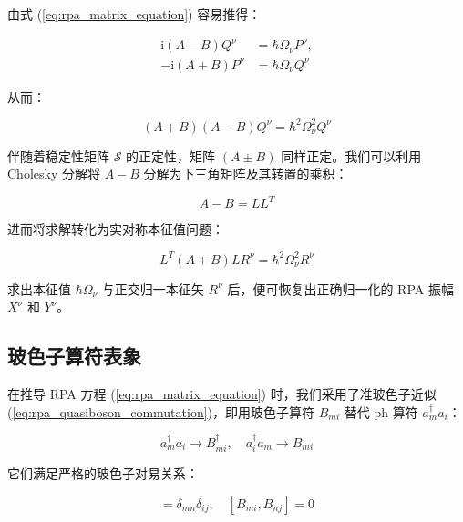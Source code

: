 由式 (\ref{eq:rpa_matrix_equation}) 容易推得：

\begin{align}
\mathrm{i}(A-B)Q^{\nu} & =\hbar\Omega_{\nu}P^{\nu},\nonumber \\
-\mathrm{i}(A+B)P^{\nu} & =\hbar\Omega_{\nu}Q^{\nu}\label{eq:rpa_pq_decoupled_system}
\end{align}

从而：

\begin{equation}
(A+B)(A-B)Q^{\nu}=\hbar^{2}\Omega^{2}_{\nu}Q^{\nu}\label{eq:rpa_squared_frequency_problem}
\end{equation}

伴随着稳定性矩阵 $\mathcal{S}$ 的正定性，矩阵 $(A\pm B)$ 同样正定。我们可以利用 Cholesky 分解将
$A-B$ 分解为下三角矩阵及其转置的乘积：

\begin{equation}
A-B=LL^{T}\label{eq:rpa_cholesky_decomposition}
\end{equation}

进而将求解转化为实对称本征值问题：

\begin{equation}
L^{T}(A+B)LR^{\nu}=\hbar^{2}\Omega^{2}_{\nu}R^{\nu}\label{eq:rpa_symmetric_eigenproblem}
\end{equation}

求出本征值 $\hbar\Omega_{\nu}$ 与正交归一本征矢 $R^{\nu}$ 后，便可恢复出正确归一化的 RPA 振幅
$X^{\nu}$ 和 $Y^{\nu}$。

\subsection{玻色子算符表象\label{subsec:8.4.5_=0073BB=008272=005B50=007B97=007B26=008868=008C61}}

在推导 RPA 方程 (\ref{eq:rpa_matrix_equation}) 时，我们采用了准玻色子近似 (\ref{eq:rpa_quasiboson_commutation})，即用玻色子算符
$B_{mi}$ 替代 ph 算符 $a^{\dagger}_{m}a_{i}$：

\begin{equation}
a^{\dagger}_{m}a_{i}\to B^{\dagger}_{mi},\quad a^{\dagger}_{i}a_{m}\to B_{mi}\label{eq:rpa_boson_mapping}
\end{equation}

它们满足严格的玻色子对易关系：

\begin{equation}
[B_{mi},B^{\dagger}_{nj}]=\delta_{mn}\delta_{ij},\quad[B_{mi},B_{nj}]=0\label{eq:rpa_boson_commutation_exact}
\end{equation}

